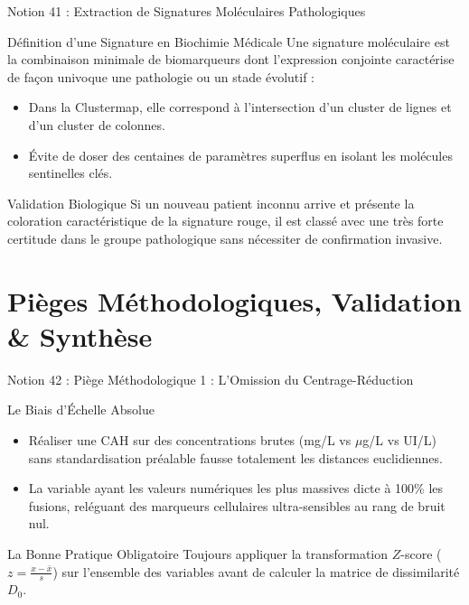 \documentclass[aspectratio=169,10pt]{beamer}
\begin{document}
\begin{frame}{Notion 41 : Extraction de Signatures Moléculaires Pathologiques}
  \begin{conceptbox}{Définition d'une Signature en Biochimie Médicale}
    \footnotesize
    Une signature moléculaire est la combinaison minimale de biomarqueurs dont l'expression conjointe caractérise de façon univoque une pathologie ou un stade évolutif :
    \begin{itemize}
      \item Dans la Clustermap, elle correspond à l'intersection d'un cluster de lignes et d'un cluster de colonnes.
      \item Évite de doser des centaines de paramètres superflus en isolant les molécules sentinelles clés.
    \end{itemize}
  \end{conceptbox}
  \vspace{1mm}
  \begin{biobox}{Validation Biologique}
    \footnotesize
    Si un nouveau patient inconnu arrive et présente la coloration caractéristique de la signature rouge, il est classé avec une très forte certitude dans le groupe pathologique sans nécessiter de confirmation invasive.
  \end{biobox}
\end{frame}

\section{Pièges Méthodologiques, Validation \& Synthèse}

\begin{frame}{Notion 42 : Piège Méthodologique 1 : L'Omission du Centrage-Réduction}
  \begin{warnbox}{Le Biais d'Échelle Absolue}
    \footnotesize
    \begin{itemize}
      \item Réaliser une CAH sur des concentrations brutes (mg/L vs $\mu$g/L vs UI/L) sans standardisation préalable fausse totalement les distances euclidiennes.
      \item La variable ayant les valeurs numériques les plus massives dicte à 100\% les fusions, reléguant des marqueurs cellulaires ultra-sensibles au rang de bruit nul.
    \end{itemize}
  \end{warnbox}
  \vspace{1mm}
  \begin{conceptbox}{La Bonne Pratique Obligatoire}
    \footnotesize
    Toujours appliquer la transformation $Z$-score ($z = \frac{x - \bar{x}}{s}$) sur l'ensemble des variables avant de calculer la matrice de dissimilarité $D_0$.
  \end{conceptbox}
\end{frame}
\end{document}
